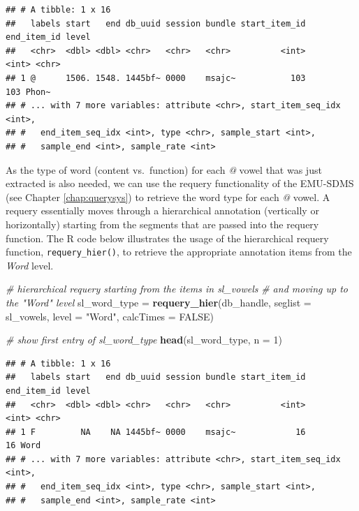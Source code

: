 \documentclass[]{book}
\newenvironment{Shaded}{\begin{snugshade}}{\end{snugshade}}
\newcommand{\CommentTok}[1]{\textcolor[rgb]{0.56,0.35,0.01}{\textit{#1}}}
\newcommand{\DataTypeTok}[1]{\textcolor[rgb]{0.13,0.29,0.53}{#1}}
\newcommand{\DecValTok}[1]{\textcolor[rgb]{0.00,0.00,0.81}{#1}}
\newcommand{\KeywordTok}[1]{\textcolor[rgb]{0.13,0.29,0.53}{\textbf{#1}}}
\newcommand{\NormalTok}[1]{#1}
\newcommand{\OtherTok}[1]{\textcolor[rgb]{0.56,0.35,0.01}{#1}}
\newcommand{\StringTok}[1]{\textcolor[rgb]{0.31,0.60,0.02}{#1}}
\begin{document}
\begin{verbatim}
## # A tibble: 1 x 16
##   labels start   end db_uuid session bundle start_item_id end_item_id level
##   <chr>  <dbl> <dbl> <chr>   <chr>   <chr>          <int>       <int> <chr>
## 1 @      1506. 1548. 1445bf~ 0000    msajc~           103         103 Phon~
## # ... with 7 more variables: attribute <chr>, start_item_seq_idx <int>,
## #   end_item_seq_idx <int>, type <chr>, sample_start <int>,
## #   sample_end <int>, sample_rate <int>
\end{verbatim}

As the type of word (content vs.~function) for each \emph{@} vowel that was just extracted is also needed, we can use the requery functionality of the EMU-SDMS (see Chapter \ref{chap:querysys}) to retrieve the word type for each \emph{@} vowel. A requery essentially moves through a hierarchical annotation (vertically or horizontally) starting from the segments that are passed into the requery function. The R code below illustrates the usage of the hierarchical requery function, \texttt{requery\_hier()}, to retrieve the appropriate annotation items from the \emph{Word} level.

\begin{Shaded}
\begin{Highlighting}[]
\CommentTok{# hierarchical requery starting from the items in sl_vowels}
\CommentTok{# and moving up to the "Word" level}
\NormalTok{sl_word_type =}\StringTok{ }\KeywordTok{requery_hier}\NormalTok{(db_handle,}
                           \DataTypeTok{seglist =}\NormalTok{ sl_vowels,}
                           \DataTypeTok{level =} \StringTok{"Word"}\NormalTok{,}
                           \DataTypeTok{calcTimes =} \OtherTok{FALSE}\NormalTok{)}

\CommentTok{# show first entry of sl_word_type}
\KeywordTok{head}\NormalTok{(sl_word_type, }\DataTypeTok{n =} \DecValTok{1}\NormalTok{)}
\end{Highlighting}
\end{Shaded}

\begin{verbatim}
## # A tibble: 1 x 16
##   labels start   end db_uuid session bundle start_item_id end_item_id level
##   <chr>  <dbl> <dbl> <chr>   <chr>   <chr>          <int>       <int> <chr>
## 1 F         NA    NA 1445bf~ 0000    msajc~            16          16 Word 
## # ... with 7 more variables: attribute <chr>, start_item_seq_idx <int>,
## #   end_item_seq_idx <int>, type <chr>, sample_start <int>,
## #   sample_end <int>, sample_rate <int>
\end{verbatim}
\end{document}
